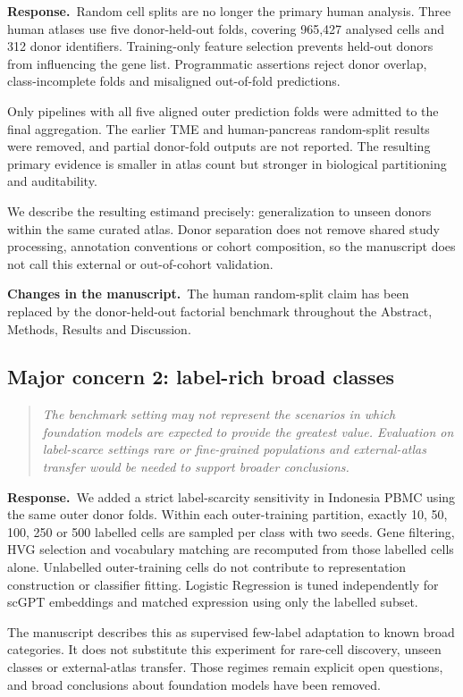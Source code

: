 \documentclass[11pt,a4paper]{article}
\newcommand{\commenttext}[1]{\begin{quote}\itshape #1\end{quote}}
\newcommand{\responsehead}{\par\noindent\textbf{Response.}\ }
\newcommand{\changehead}{\par\noindent\textbf{Changes in the manuscript.}\ }
\begin{document}
\responsehead Random cell splits are no longer the primary human analysis. Three human atlases use five donor-held-out folds, covering 965,427 analysed cells and 312 donor identifiers. Training-only feature selection prevents held-out donors from influencing the gene list. Programmatic assertions reject donor overlap, class-incomplete folds and misaligned out-of-fold predictions.

Only pipelines with all five aligned outer prediction folds were admitted to the final aggregation. The earlier TME and human-pancreas random-split results were removed, and partial donor-fold outputs are not reported. The resulting primary evidence is smaller in atlas count but stronger in biological partitioning and auditability.

We describe the resulting estimand precisely: generalization to unseen donors within the same curated atlas. Donor separation does not remove shared study processing, annotation conventions or cohort composition, so the manuscript does not call this external or out-of-cohort validation.

\changehead The human random-split claim has been replaced by the donor-held-out factorial benchmark throughout the Abstract, Methods, Results and Discussion.

\subsection*{Major concern 2: label-rich broad classes}

\commenttext{The benchmark setting may not represent the scenarios in which foundation models are expected to provide the greatest value. Evaluation on label-scarce settings rare or fine-grained populations and external-atlas transfer would be needed to support broader conclusions.}

\responsehead We added a strict label-scarcity sensitivity in Indonesia PBMC using the same outer donor folds. Within each outer-training partition, exactly 10, 50, 100, 250 or 500 labelled cells are sampled per class with two seeds. Gene filtering, HVG selection and vocabulary matching are recomputed from those labelled cells alone. Unlabelled outer-training cells do not contribute to representation construction or classifier fitting. Logistic Regression is tuned independently for scGPT embeddings and matched expression using only the labelled subset.

The manuscript describes this as supervised few-label adaptation to known broad categories. It does not substitute this experiment for rare-cell discovery, unseen classes or external-atlas transfer. Those regimes remain explicit open questions, and broad conclusions about foundation models have been removed.
\end{document}
